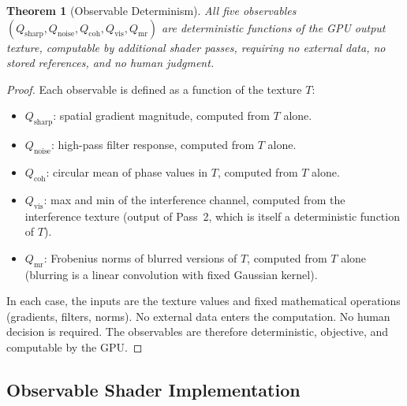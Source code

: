 \documentclass[11pt,twocolumn,a4paper]{article}
\newtheorem{theorem}{Theorem}[section]
\theoremstyle{definition}
\theoremstyle{remark}
\newcommand{\Qsharp}{Q_{\mathrm{sharp}}}
\newcommand{\Qnoise}{Q_{\mathrm{noise}}}
\newcommand{\Qcoh}{Q_{\mathrm{coh}}}
\newcommand{\Qvis}{Q_{\mathrm{vis}}}
\newcommand{\Qmr}{Q_{\mathrm{mr}}}
\begin{document}
\begin{theorem}[Observable Determinism]
\label{thm:observable_determinism}
All five observables $(\Qsharp, \Qnoise, \Qcoh, \Qvis, \Qmr)$ are deterministic functions of the GPU output texture, computable by additional shader passes, requiring no external data, no stored references, and no human judgment.
\end{theorem}

\begin{proof}
Each observable is defined as a function of the texture $T$:
\begin{itemize}[nosep]
\item $\Qsharp$: spatial gradient magnitude, computed from $T$ alone.
\item $\Qnoise$: high-pass filter response, computed from $T$ alone.
\item $\Qcoh$: circular mean of phase values in $T$, computed from $T$ alone.
\item $\Qvis$: max and min of the interference channel, computed from the interference texture (output of Pass~2, which is itself a deterministic function of $T$).
\item $\Qmr$: Frobenius norms of blurred versions of $T$, computed from $T$ alone (blurring is a linear convolution with fixed Gaussian kernel).
\end{itemize}
In each case, the inputs are the texture values and fixed mathematical operations (gradients, filters, norms). No external data enters the computation. No human decision is required. The observables are therefore deterministic, objective, and computable by the GPU.
\end{proof}

\subsection{Observable Shader Implementation}
\end{document}
